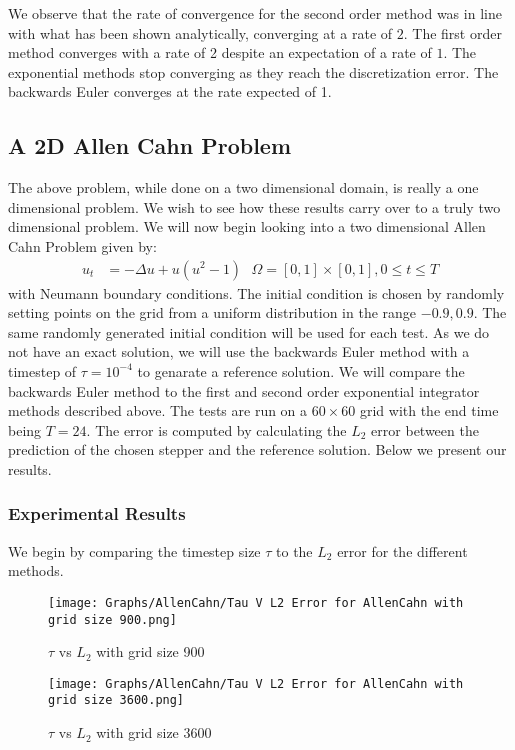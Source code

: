 We observe that the rate of convergence for the second order method was in line with what has been shown analytically\cite{Huang2022}, converging at a rate of $2$.
The first order method converges with a rate of 2 despite an expectation of a rate of $1$\cite{Huang2022}.
The exponential methods stop converging as they reach the discretization error.
The backwards Euler converges at the rate expected of 1.

\subsection{A 2D Allen Cahn Problem}
The above problem, while done on a two dimensional domain, is really a one dimensional problem.
We wish to see how these results carry over to a truly two dimensional problem. 
We will now begin looking into a two dimensional Allen Cahn Problem given by:
\begin{align*}
    u_t &= -\Delta u + u (u^2-1) \text{ } \Omega=[0,1]\times[0,1], 0\leq t \leq T
\end{align*}
with Neumann boundary conditions.
The initial condition is chosen by randomly setting points on the grid from a uniform distribution in the range $-0.9,0.9$.
The same randomly generated initial condition will be used for each test.
As we do not have an exact solution, we will use the backwards Euler method with a timestep of $\tau = 10^{-4}$ to genarate a reference solution.
We will compare the backwards Euler method to the first and second order exponential integrator methods described above.
The tests are run on a $60\times60$ grid with the end time being $T=24$.
The error is computed by calculating the $L_2$ error between the prediction of the chosen stepper and the reference solution. 
Below we present our results.

\subsubsection{Experimental Results}

We begin by comparing the timestep size $\tau$ to the $L_2$ error for the different methods.

\begin{figure}[H]
    \centering
    \begin{minipage}{0.49\textwidth}
        \texttt{[image: Graphs/AllenCahn/Tau V L2 Error for AllenCahn with grid size 900.png]} %
        \caption{$\tau$ vs $L_2$ with grid size 900}
        \label{fig:ACtauE}
    \end{minipage}\hfill
    \centering
    \begin{minipage}{0.49\textwidth}
        \texttt{[image: Graphs/AllenCahn/Tau V L2 Error for AllenCahn with grid size 3600.png]} %
        \caption{$\tau$ vs $L_2$ with grid size 3600}
        \label{fig:ACtauE1024}
    \end{minipage}\hfill
\end{figure}

